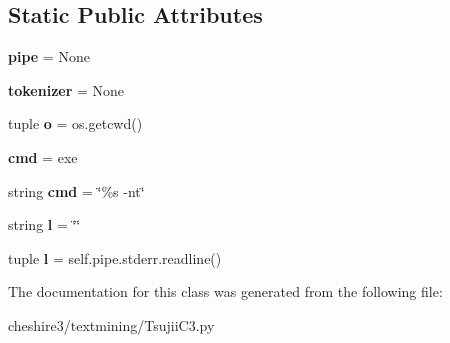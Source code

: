 \subsection*{Static Public Attributes}
\begin{DoxyCompactItemize}
\item 
\hypertarget{classcheshire3_1_1textmining_1_1_tsujii_c3_1_1_genia_object_a346b0960dd9b388daa8479ec705d824d}{{\bfseries pipe} = None}\label{classcheshire3_1_1textmining_1_1_tsujii_c3_1_1_genia_object_a346b0960dd9b388daa8479ec705d824d}

\item 
\hypertarget{classcheshire3_1_1textmining_1_1_tsujii_c3_1_1_genia_object_abfaa117e6237f855c78c5dfa153fc6f6}{{\bfseries tokenizer} = None}\label{classcheshire3_1_1textmining_1_1_tsujii_c3_1_1_genia_object_abfaa117e6237f855c78c5dfa153fc6f6}

\item 
\hypertarget{classcheshire3_1_1textmining_1_1_tsujii_c3_1_1_genia_object_a74417874348cd6d4c33fb58ad86b4d3c}{tuple {\bfseries o} = os.\-getcwd()}\label{classcheshire3_1_1textmining_1_1_tsujii_c3_1_1_genia_object_a74417874348cd6d4c33fb58ad86b4d3c}

\item 
\hypertarget{classcheshire3_1_1textmining_1_1_tsujii_c3_1_1_genia_object_a32938e54b59a9820080532c3c6b63b70}{{\bfseries cmd} = exe}\label{classcheshire3_1_1textmining_1_1_tsujii_c3_1_1_genia_object_a32938e54b59a9820080532c3c6b63b70}

\item 
\hypertarget{classcheshire3_1_1textmining_1_1_tsujii_c3_1_1_genia_object_ae5e9e906a6dc9b9a0d8a942ff13abd2d}{string {\bfseries cmd} = \char`\"{}\%s -\/nt\char`\"{}}\label{classcheshire3_1_1textmining_1_1_tsujii_c3_1_1_genia_object_ae5e9e906a6dc9b9a0d8a942ff13abd2d}

\item 
\hypertarget{classcheshire3_1_1textmining_1_1_tsujii_c3_1_1_genia_object_a72158068945dd704f7176704d712da4b}{string {\bfseries l} = \char`\"{}\char`\"{}}\label{classcheshire3_1_1textmining_1_1_tsujii_c3_1_1_genia_object_a72158068945dd704f7176704d712da4b}

\item 
\hypertarget{classcheshire3_1_1textmining_1_1_tsujii_c3_1_1_genia_object_a3ed0b4f229abb3138372d1c3a1a9305a}{tuple {\bfseries l} = self.\-pipe.\-stderr.\-readline()}\label{classcheshire3_1_1textmining_1_1_tsujii_c3_1_1_genia_object_a3ed0b4f229abb3138372d1c3a1a9305a}

\end{DoxyCompactItemize}


The documentation for this class was generated from the following file\-:\begin{DoxyCompactItemize}
\item 
cheshire3/textmining/Tsujii\-C3.\-py\end{DoxyCompactItemize}
